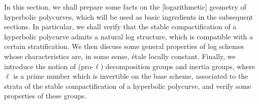 In this section, we shall prepare some facts on the [logarithmetic] geometry of hyperbolic polycurves, which will be used as basic ingredients in the subsequent sections. In particular, we shall verify that the stable compactification of a hyperbolic polycurve admits a natural log structure, which is compatible with a certain stratification. We then discuss some general properties of log schemes whose characteristics are, in some sense, \'{e}tale locally constant. Finally, we introduce the notion of (pro-$\ell$) decomposition groups and inertia groups, where $\ell$ is a prime number which is invertible on the base scheme, associated to the strata of the stable compactification of a hyperbolic polycurve, and verify some properties of these groups.


